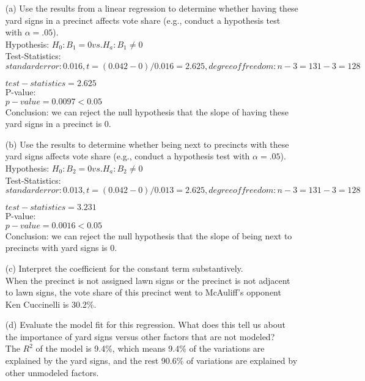 \documentclass[12pt,letterpaper]{article}
\begin{document}
\vspace{.5cm}
\begin{enumerate}
	\item [(a)] Use the results from a linear regression to determine whether having these yard signs in a precinct affects vote share (e.g., conduct a hypothesis test with $\alpha = .05$).\\
	Hypothesis: $ H_{0}: B_{1} = 0  vs.  H_{a}: B_{1} \not = 0 $\\		
	Test-Statistics: \\
	$ standard error: 0.016, t = (0.042-0) /0.016 = 2.625, degree  of freedom: n - 3 = 131-3 = 128$
		
	$test-statistics = 2.625$\\	
	P-value:\\
	  
	 $p-value = 0.0097 < 0.05$\\
	 Conclusion: we can reject the null hypothesis that the slope of having these yard signs in a precinct is 0. 
	
	
	\newpage		
	\item [(b)]  Use the results to determine whether being
	next to precincts with these yard signs affects vote
	share (e.g., conduct a hypothesis test with $\alpha = .05$).\\
		Hypothesis: $ H_{0}: B_{2} = 0  vs.  H_{a}: B_{2} \not = 0 $\\		
	Test-Statistics: \\
	$ standard error: 0.013, t = (0.042-0) /0.013 = 2.625, degree  of freedom: n - 3 = 131-3 = 128$
	
	$test-statistics = 3.231$\\	
	P-value:\\
	 
	$p-value = 0.0016 < 0.05$\\
	Conclusion: we can reject the null hypothesis that the slope of being next to precincts with yard signs is 0. 
	
	
	\vspace{7cm}
	\item [(c)] Interpret the coefficient for the constant term substantively.\\
	When the precinct is not assigned lawn signs or the precinct is not  adjacent to lawn signs, the vote share of this precinct went to McAuliff's opponent Ken Cuccinelli is 30.2\%. 
		\vspace{7cm}
		
	\item [(d)] Evaluate the model fit for this regression.  What does this	tell us about the importance of yard signs versus other factors that are not modeled?\\
	The $R^2$ of the model is 9.4\%, which means 9.4\% of the variations are explained by the yard signs, and the rest 90.6\% of variations are explained by other unmodeled factors. 
	
\end{enumerate}  
\end{document}
